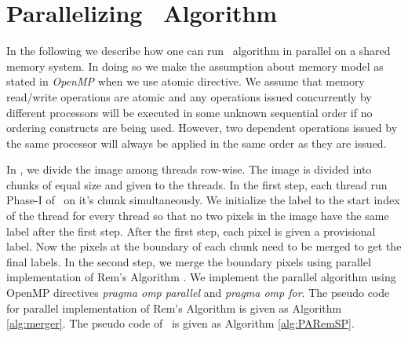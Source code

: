 \section{Parallelizing \aremsp\ Algorithm}
\label{sec:parallel_algo}

In the following we describe how one can run \aremsp\ algorithm in parallel
on a shared memory system. In doing so we make the assumption about memory
model as stated in {\em OpenMP} when we use atomic directive. We assume that
memory read/write operations are atomic and any operations issued concurrently 
by different processors will be executed in some unknown sequential order if
no ordering constructs are being used. However, two dependent operations issued
by the same processor will always be applied in the same order as they are
issued.\cite{Patwary2012_PARemSP}

In \paremsp, we divide the image among threads row-wise. The image is
divided into chunks of equal size and given to the threads. In the first step,
each thread run Phase-I of \aremsp\ on it's chunk simultaneously. We
initialize the label to the start index of the thread for every thread so that no 
two pixels in the image have the same label after the first step. After the first step, 
each pixel is given a provisional label. Now the pixels at the boundary of each chunk need to 
be merged to get the final labels. In the second step, we merge the boundary pixels using parallel 
implementation of Rem's Algorithm \cite{Patwary2012_PARemSP}. We implement the parallel algorithm using
OpenMP directives {\em pragma omp parallel} and {\em pragma omp for}. The
pseudo code for parallel implementation of Rem's Algorithm is given as Algorithm
\ref{alg:merger}. The pseudo code of \paremsp\ is given as Algorithm
\ref{alg:PARemSP}.

 